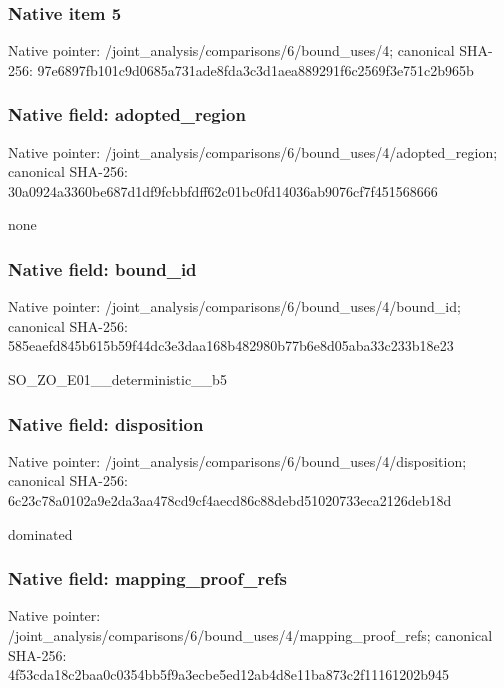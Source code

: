 \documentclass[10pt,a4paper]{article}
\begin{document}
\subsubsection{Native item 5}
Native pointer: /joint\_\allowbreak{}analysis/comparisons/6/bound\_\allowbreak{}uses/4; canonical SHA-256: 97e6897fb101c9d0685a731ade8fda3c3d1aea889291f6c2569f3e751c2b965b

\subsubsection{Native field: adopted\_\allowbreak{}region}
Native pointer: /joint\_\allowbreak{}analysis/comparisons/6/bound\_\allowbreak{}uses/4/adopted\_\allowbreak{}region; canonical SHA-256: 30a0924a3360be687d1df9fcbbfdff62c01bc0fd14036ab9076cf7f451568666

\begingroup\raggedright\sloppy none\par\endgroup

\subsubsection{Native field: bound\_\allowbreak{}id}
Native pointer: /joint\_\allowbreak{}analysis/comparisons/6/bound\_\allowbreak{}uses/4/bound\_\allowbreak{}id; canonical SHA-256: 585eaefd845b615b59f44dc3e3daa168b482980b77b6e8d05aba33c233b18e23

\begingroup\raggedright\sloppy SO\_\allowbreak{}ZO\_\allowbreak{}E01\_\allowbreak{}\_\allowbreak{}deterministic\_\allowbreak{}\_\allowbreak{}b5\par\endgroup

\subsubsection{Native field: disposition}
Native pointer: /joint\_\allowbreak{}analysis/comparisons/6/bound\_\allowbreak{}uses/4/disposition; canonical SHA-256: 6c23c78a0102a9e2da3aa478cd9cf4aecd86c88debd51020733eca2126deb18d

\begingroup\raggedright\sloppy dominated\par\endgroup

\subsubsection{Native field: mapping\_\allowbreak{}proof\_\allowbreak{}refs}
Native pointer: /joint\_\allowbreak{}analysis/comparisons/6/bound\_\allowbreak{}uses/4/mapping\_\allowbreak{}proof\_\allowbreak{}refs; canonical SHA-256: 4f53cda18c2baa0c0354bb5f9a3ecbe5ed12ab4d8e11ba873c2f11161202b945
\end{document}

